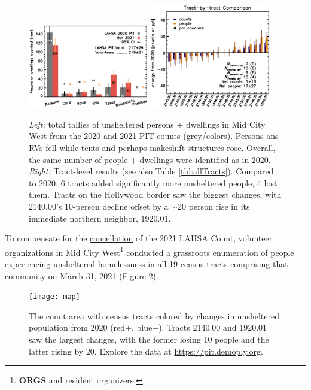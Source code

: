\documentclass[11pt]{article}
\def\bfr{\bf\color{red}}
\begin{document}
\begin{figure}[h]
	\centering
	\includegraphics[width = 0.47\textwidth, trim = 1cm 0cm 0cm 1cm]{bars}
	\includegraphics[width = 0.47\textwidth, trim = 0cm 0cm 0cm 1cm]{tractsYrYr.eps}	
	\caption{{\it Left:} total tallies of unsheltered persons + dwellings in Mid City West from 
			the 2020 and 2021 PIT counts (grey/colors). Persons ans RVs fell while 
			tents and perhaps makeshift structures rose. Overall, the same number of 
			people + dwellings were identified as in 2020. {\it Right:} Tract-level
			results (see also Table \ref{tbl:allTracts}). Compared to 2020, 6 tracts 
			added significantly more unsheltered people,
			4 lost them. Tracts on the Hollywood border saw the biggest changes, 
			with 2140.00's 10-person decline offset by a $\sim$20 person rise in its
			immediate northern neighbor, 1920.01.}
	\label{fig:rawCounts}
\end{figure}


 To compensate for the 
\href{https://laist.com/latest/post/20201209/LAHSA-cancels-2021-homeless-count-los-angeles-covid-19}
{cancellation} of the 2021 LAHSA Count, volunteer organizations in Mid City 
West\footnote{{\bfr ORGS} and resident organizers.} conducted a grassroots enumeration of 
people experiencing unsheltered homelessness 
in all 19 census tracts comprising that community on March 31, 2021 (Figure \ref{fig:tcomp}).\\

\begin{figure}
	\centering
	\texttt{[image: map]}
	\caption{The count area with census tracts colored by  
			changes in unsheltered population from 2020 (red$+$, blue$-$).
			Tracts 2140.00 and 1920.01 saw the largest changes, with the former losing
			10 people and the latter rising by 20. 
			Explore the data at \url{https://pit.demoply.org}.}
	\label{fig:tcomp}
\end{figure} 
\end{document}
